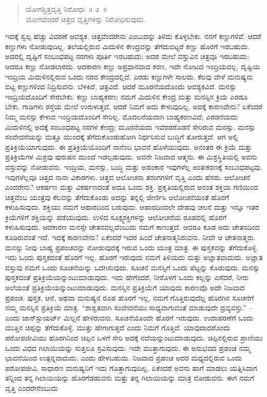 \begin{verse}
ಯೋಗಶ್ಚಿತ್ತವೃತ್ತಿ ನಿರೋಧಃ~॥ ೨~॥\\ಯೋಗವೆಂದರೆ ಚಿತ್ತದ ವೃತ್ತಿಗಳನ್ನು ನಿರೋಧಿಸುವುದು. 
\end{verse}

ಇದಕ್ಕೆ ಸ್ವಲ್ಪ ಹೆಚ್ಚು ವಿವರಣೆ ಆವಶ್ಯಕ. ಚಿತ್ತವೆಂದರೇನು ಎಂಬುದನ್ನು ತಿಳಿದು ಕೊಳ್ಳಬೇಕು. ನನಗೆ ಕಣ್ಣುಗಳಿವೆ. ಆದರೆ ಕಣ್ಣುಗಳು ನೋಡುವುದಿಲ್ಲ. ತಲೆಯಲ್ಲಿರುವ ಮಿದುಳಿನ ಕೇಂದ್ರವನ್ನು ತೆಗೆದುಬಿಟ್ಟರೆ ಕಣ್ಣು ಹೊರಗೆ ಇರಬಹುದು. ಅದರಲ್ಲಿ ದೃಷ್ಟಿಗೆ ಸಂಬಂಧಪಟ್ಟ ನರಗಳು ಪೂರ್ತಿ ಇರಬಹುದು; ಅದರ ಮೇಲೆ ವಸ್ತುವಿನ ಚಿತ್ರವೂ ಇರಬಹುದು; ಆದರೂ ಕಣ್ಣು ನೋಡಲಾರದು. ಆದಕಾರಣ ಕಣ್ಣು ಅಪ್ರಧಾನವಾದ ಕರಣ, ಇದೇ ನೋಟದ ಇಂದ್ರಿಯವಲ್ಲ. ದೃಷ್ಟಿಯ ಇಂದ್ರಿಯ ಮಿದುಳಿನಲ್ಲಿರುವ ಒಂದು ನರದ ಕೇಂದ್ರದಲ್ಲಿದೆ. ಎರಡು ಕಣ್ಣುಗಳೇ ಸಾಲದು. ಕೆಲವು ವೇಳೆ ಮನುಷ್ಯನು ಬಿಟ್ಟ ಕಣ್ಣುಗಳಿಂದ ನಿದ್ರಿಸುವನು. ಬೆಳಕಿದೆ, ಚಿತ್ರವಿದೆ. ಆದರೆ ಮೂರನೆಯದೊಂದು ಆವಶ್ಯಕವಿದೆ. ಮನಸ್ಸು ಇಂದ್ರಿಯದೊಂದಿಗೆ ಸೇರಬೇಕು. ಕಣ್ಣು ಬಾಹ್ಯಕರಣ; ನಮಗೆ ಮಿದುಳಿನ ಕೇಂದ್ರ ಮತ್ತು ಮನಸ್ಸಿನ ಕ್ರಿಯೆ ಎರಡೂ ಬೇಕು. ಗಾಡಿಗಳು ರಸ್ತೆಯ ಮೇಲೆ ಉರುಳುತ್ತವೆ. ಆದರೆ ನಿಮಗೆ ಅದು ಕೇಳುವುದಿಲ್ಲ. ಅದಕ್ಕೆ ಕಾರಣವೇನು? ಏಕೆಂದರೆ ನಿಮ್ಮ ಮನಸ್ಸು ಕೇಳುವ ಇಂದ್ರಿಯದೊಂದಿಗೆ ಸೇರಿಲ್ಲ. ಮೊದಲನೆಯದಾಗಿ ಬಾಹ್ಯಕರಣವಿದೆ; ಎರಡನೆಯದು ಮಿದುಳಿನಲ್ಲಿ ಅದಕ್ಕೆ ಸಂಬಂಧಪಟ್ಟ ನರಗಳ ಕೇಂದ್ರ; ಮೂರನೆಯದು ಇವೆರಡರೊಡನೆ ಸೇರಿರುವ ಮನಸ್ಸು. ಮನಸ್ಸು ಸಂವೇದನೆಯನ್ನು ಮತ್ತೂ ಮುಂದಕ್ಕೆ ತೆಗೆದುಕೊಂಡುಹೋಗಿ ನಿರ್ಧರಿಸುವ ಬುದ್ಧಿಗೆ ತೋರುತ್ತದೆ. ಆಗ ಅಲ್ಲಿ ಪ್ರತಿಕ್ರಿಯೆಯಾಗುವುದು. ಈ ಪ್ರತಿಕ್ರಿಯೆಯೊಂದಿಗೆ ನಾನೆಂಬ ಭಾವನೆ ಹೊಳೆಯುವುದು. ಅನಂತರ ಈ ಕ್ರಿಯೆ ಮತ್ತು ಪ್ರತಿಕ್ರಿಯೆಗಳ ಮಿಶ್ರವು ಪುರುಷನ ಮುಂದೆ ಇಡಲ್ಪಡುವುದು. ಅವನೇ ನಿಜವಾದ ಆತ್ಮನು. ಈ ಮಿಶ್ರಸ್ಥಿತಿಯಲ್ಲಿ ಅವನು ವಸ್ತುವನ್ನು ನೋಡುವನು. ಇಂದ್ರಿಯ, ಮನಸ್ಸು, ಬುದ್ಧಿ ಮತ್ತು ಅಹಂಕಾರ ಇವುಗಳೆಲ್ಲ ಅಂತಃಕರಣಕ್ಕೆ ಸಂಬಂಧಪಟ್ಟವು. ಇವುಗಳೆಲ್ಲವೂ ಚಿತ್ತದ ನಾನಾ ವಿಕಾರಗಳು. ಚಿತ್ತದ ಆಲೋಚನಾ ತರಂಗಗಳಿಗೆ ವೃತ್ತಿ ಎಂದು ಹೆಸರು. ಆಲೋಚನೆ ಎಂದರೇನು? ಆಕರ್ಷಣ ಮತ್ತು ವಿಕರ್ಷಣದಂತೆ ಅದೂ ಒಂದು ಶಕ್ತಿ. ಪ್ರಕೃತಿಯಲ್ಲಿರುವ ಅನಂತ ಶಕ್ತಿಯ ಗಣಿಯಿಂದ ಚಿತ್ತವೆಂಬ ಯಂತ್ರವು ಕೆಲವನ್ನು ತೆಗೆದುಕೊಂಡು ಅದನ್ನು ತನ್ನಲ್ಲಿ ಜೀರ್ಣಿಸಿ ಆಲೋಚನೆಯಂತೆ ಹೊರಗೆ ಕಳುಹಿಸುವುದು. ಶಕ್ತಿಯು ನಮಗೆ ಆಹಾರದಿಂದ ಬರುವುದು. ಆಹಾರದಿಂದಲೇ ದೇಹವು ಚಲನೆ ಮತ್ತು ಇನ್ನೂ ಇತರ ಕ್ರಿಯೆಗಳಿಗೆ ಶಕ್ತಿಯನ್ನು ಪಡೆಯುವುದು. ಉಳಿದ ಸೂಕ್ಷ್ಮಶಕ್ತಿಗಳನ್ನು ಆಲೋಚನೆಯ ರೂಪದಲ್ಲಿ ಹೊರಗೆ ಕಳುಹಿಸುವುದು. ಆದಕಾರಣ ಮನಸ್ಸೇ ಚೇತನವಲ್ಲವೆಂಬುದು ನಮಗೆ ಕಾಣುತ್ತದೆ. ಆದರೂ ಕೂಡ ಅದು ಚೇತನದಿಂದ ಕೂಡಿರುವಂತೆ ಇದೆ. ಇದಕ್ಕೆ ಕಾರಣವೇನು? ಏಕೆಂದರೆ ಇದರ ಹಿಂದೆ ಚೇತನಾತ್ಮನಿರುವನು. ನೀವೇ ಆ ಚೇತನಾತ್ಮರು. ಮನಸ್ಸು ನೀವು ಬಾಹ್ಯ ಪ್ರಪಂಚವನ್ನು ನೋಡುವುದಕ್ಕೆ ಇರುವ ಒಂದು ಯಂತ್ರ ಮಾತ್ರ. ಈ ಪುಸ್ತಕವನ್ನು ತೆಗೆದುಕೊಳ್ಳಿ. ಇದು ಒಂದು ಪುಸ್ತಕದಂತೆ ಹೊರಗೆ ಇಲ್ಲ. ಹೊರಗೆ ಇರುವುದು ನಮಗೆ ತಿಳಿಯದು ಮತ್ತು ಅಜ್ಞಾತವಾದುದು. ಅಜ್ಞಾತ ವಸ್ತುವು ನಮಗೆ ಒಂದು ಸೂಚನೆಯನ್ನು ಒದಗಿಸುವುದು. ಸೂಚನೆ ಮನಸ್ಸಿಗೆ ಒಂದು ಪೆಟ್ಟನ್ನು ಕೊಡುವುದು. ಮನಸ್ಸು ಪುಸ್ತಕದಂತೆ ಪ್ರತಿಕ್ರಿಯೆಯನ್ನುಂಟುಮಾಡುವುದು. ಇದು ಹೇಗೆಂದರೆ, ನೀರೊಳಗೆ ಒಂದು ಕಲ್ಲನ್ನು ಎಸೆದರೆ, ನೀರು ಅಲೆಯಂತೆ ಪ್ರತಿಕ್ರಿಯೆಯನ್ನುಂಟುಮಾಡುವುದು. ಮನಸ್ಸಿನ ಪ್ರತಿಕ್ರಿಯೆಗೆ ಯಾವುದು ಕಾರಣವೊ ಅದೇ ನಿಜವಾದ ಪ್ರಪಂಚ. ಪುಸ್ತಕ, ಆನೆ, ಅಥವಾ ಮನುಷ್ಯನ ರೂಪ ಹೊರಗೆ ಇಲ್ಲ. ನಮಗೆ ಗೊತ್ತಿರುವುದೆಲ್ಲ ಹೊರಗಿನ ಸೂಚನೆಗೆ ನಮ್ಮ ಮನಸ್ಸಿನ ಪ್ರತಿಕ್ರಿಯೆ ಮಾತ್ರ. “ಶಾಶ್ವತವಾಗಿ ಸಂವೇದನೆಯು ಸಾಧ್ಯವಾಗುವಂತೆ ಮಾಡುವುದೇ ದ್ರವ್ಯವಸ್ತು.” –ಎಂದು ಜಾನ್​ಸ್ಟುಯರ್ಟ್​ ಮಿಲ್ಲನೆ ಹೇಳಿರುವನು. ಸೂಚನೆಯೊಂದೇ ಹೊರಗೆ ಇರುವುದು. ಉದಾಹರಣೆಗೆ ಒಂದು ಮುತ್ತಿನ ಚಿಪ್ಪನ್ನು ತೆಗೆದುಕೊಳ್ಳಿ. ಮುತ್ತು ಹೇಗಾಗುತ್ತದೆ ಎಂದು ನಿಮಗೆ ಗೊತ್ತಿದೆ. ಯಾವುದಾದರೊಂದು ಪರೋಪಜೀವಿಯು ಹೊರಗಿನಿಂದ ಚಿಪ್ಪಿನ ಒಳಗೆ ಸೇರಿ ಅದಕ್ಕೆ ನವೆಯನ್ನುಂಟುಮಾಡುವುದು. ಚಿಪ್ಪಿನಲ್ಲಿರುವ ಪ್ರಾಣಿಯು ಒಂದು ವಿಧದ ಗಿಲಾಯಿಯನ್ನು ಸುತ್ತಲೂ ಸ್ರವಿಸುವುದು. ಇದೇ ಮುತ್ತಾಗುವುದು. ಈ ಅನುಭವದ ಪ್ರಪಂಚ ನಮ್ಮ ಭಾವನೆಯಿಂದ ಉತ್ಪನ್ನವಾದುದು, ಎಂದು ಹೇಳಬಹುದು. ನಿಜವಾದ ಪ್ರಪಂಚ ಅದರ ಮಧ್ಯದಲ್ಲಿರುವ ಒಂದು ಪರೋಪಜೀವಿ. ಸಾಧಾರಣ ಮನುಷ್ಯನಿಗೆ ಇದು ಗೊತ್ತಾಗುವುದಿಲ್ಲ. ಏಕೆಂದರೆ ಅವನು ಹಾಗೆ ಮಾಡಲು ಯತ್ನಿಸಿದಾಗ ತನ್ನಿಂದ ತನ್ನ ಗಿಲಾಯಿಯನ್ನು ಹೊರಗೆಡಹುವನು ಮತ್ತು ತನ್ನ ಗಿಲಾಯಿಯನ್ನು ಮಾತ್ರ ನೋಡುವನು. ಈಗ ನಮಗೆ ವೃತ್ತಿ ಎಂದರೇನೆಂಬುದು 